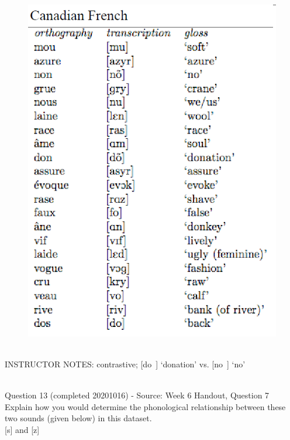 \documentclass[12pt]{article}
\begin{document}
\begin{figure}[H]
\includegraphics{../images/canadianfrench.png}
\end{figure}

~\\
INSTRUCTOR NOTES: contrastive; [do~] ‘donation’ vs. [no~] ‘no’


~\\

{\large Question 13} (completed 20201016) - Source: Week 6 Handout, Question 7\\

Explain how you would determine the phonological relationship between these two sounds (given below) in this dataset.\\

{[s]} and {[z]}
\end{document}
